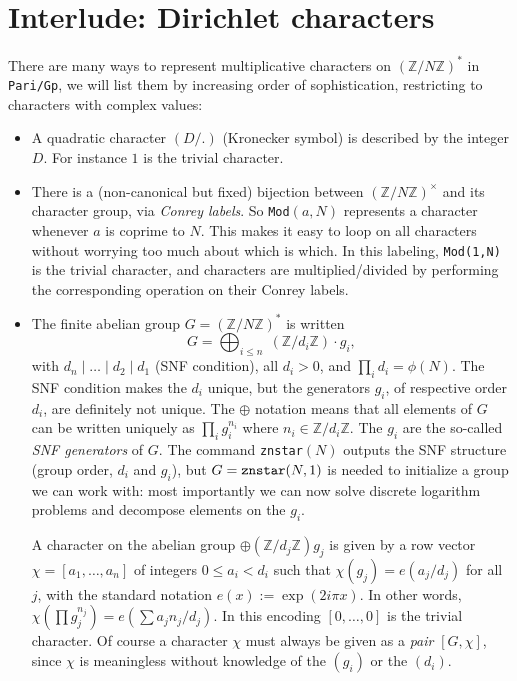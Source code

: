 \documentclass[11pt]{article}
\newcommand{\Z}{{\mathbb Z}}
\def\kbd#1{{\tt #1}}
\begin{document}
\section{Interlude: Dirichlet characters}

There are many ways to represent multiplicative characters on $(\Z/N\Z)^*$ in
\kbd{Pari/Gp}, we will list them by increasing order of sophistication,
restricting to characters with complex values:

\begin{itemize}

\item A quadratic character $(D/.)$ (Kronecker symbol) is described by
the integer $D$. For instance $1$ is the trivial character.

\item There is a (non-canonical but fixed) bijection between $(\Z/N\Z)^\times$
and its character group, via \emph{Conrey labels}. So \kbd{Mod}$(a,N)$
represents a character whenever $a$ is coprime to $N$. This makes it easy
to loop on all characters without worrying too much about which is which.
In this labeling, \kbd{Mod(1,N)} is the trivial character, and characters
are multiplied/divided by performing the corresponding operation on their
Conrey labels.

\item The finite abelian group $G = (\Z/N\Z)^*$ is written
$$G = \bigoplus_{i\leq n}\; (\Z/d_i\Z) \cdot g_i,$$
with $d_n \mid \dots \mid d_2 \mid d_1$ (SNF condition), all $d_i > 0$, and
$\prod_i d_i = \phi(N)$. The SNF condition makes the $d_i$ unique, but the
generators $g_i$, of respective order $d_i$, are definitely not unique. The
$\oplus$ notation means that all elements of $G$ can be written uniquely as
$\prod_i g_i^{n_i}$ where $n_i \in \Z/d_i\Z$. The $g_i$ are the so-called
\emph{SNF generators} of $G$. The command \kbd{znstar}$(N)$ outputs the SNF
structure (group order, $d_i$ and  $g_i$), but $G = \kbd{znstar}(N, 1)$ is
needed to initialize a group we can work with: most importantly we can now
solve discrete logarithm problems and decompose elements on the $g_i$.

A character on the abelian group $\oplus (\Z/d_j\Z) g_j$ is given by a row
vector $\chi = [a_1,\ldots,a_n]$ of integers $0\leq a_i  < d_i$ such that
$\chi(g_j) = e(a_j / d_j)$ for all $j$, with the standard notation $e(x) :=
\exp(2i\pi x)$. In other words, $\chi(\prod g_j^{n_j}) = e(\sum a_j n_j /
d_j)$. In this encoding $[0,\dots,0]$ is the trivial character. Of course
a character $\chi$ must always be given as a \emph{pair} $[G,\chi]$,
since $\chi$ is meaningless without knowledge of the $(g_i)$ or the $(d_i)$.
\end{itemize}
\end{document}
